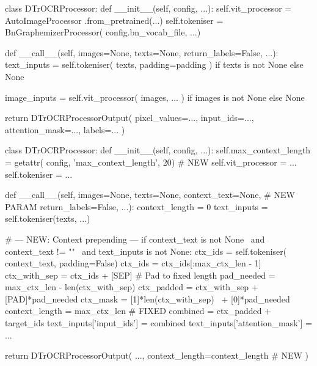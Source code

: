 \documentclass[11pt, a4paper]{report}
\begin{document}
\begin{minipage}[t]{0.48\textwidth}
\begin{originalcode}
class DTrOCRProcessor:
  def __init__(self, config, ...):
    self.vit_processor = AutoImageProcessor
      .from_pretrained(...)
    self.tokeniser = BnGraphemizerProcessor(
      config.bn_vocab_file, ...)

  def __call__(self, images=None,
      texts=None, return_labels=False,
      ...):
    text_inputs = self.tokeniser(
      texts, padding=padding
    ) if texts is not None else None

    image_inputs = self.vit_processor(
      images, ...
    ) if images is not None else None

    return DTrOCRProcessorOutput(
      pixel_values=...,
      input_ids=...,
      attention_mask=...,
      labels=...
    )
\end{originalcode}
\end{minipage}
\hfill
\begin{minipage}[t]{0.48\textwidth}
\begin{newcode}
class DTrOCRProcessor:
  def __init__(self, config, ...):
    self.max_context_length = getattr(
      config, 'max_context_length', 20)  # NEW
    self.vit_processor = ...
    self.tokeniser = ...

  def __call__(self, images=None,
      texts=None,
      context_text=None,  # NEW PARAM
      return_labels=False, ...):
    context_length = 0
    text_inputs = self.tokeniser(texts, ...)

    # --- NEW: Context prepending ---
    if context_text is not None \
       and context_text != "" \
       and text_inputs is not None:
      ctx_ids = self.tokeniser(
        context_text, padding=False)
      ctx_ids = ctx_ids[:max_ctx_len - 1]
      ctx_with_sep = ctx_ids + [SEP]
      # Pad to fixed length
      pad_needed = max_ctx_len - len(ctx_with_sep)
      ctx_padded = ctx_with_sep + [PAD]*pad_needed
      ctx_mask = [1]*len(ctx_with_sep) \
               + [0]*pad_needed
      context_length = max_ctx_len  # FIXED
      combined = ctx_padded + target_ids
      text_inputs['input_ids'] = combined
      text_inputs['attention_mask'] = ...

    return DTrOCRProcessorOutput(
      ...,
      context_length=context_length  # NEW
    )
\end{newcode}
\end{minipage}
\end{document}
